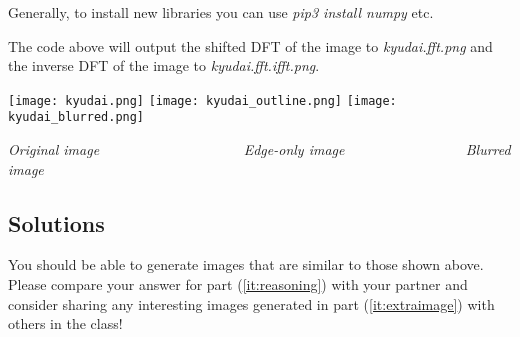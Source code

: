 Generally, to install new libraries you can use \emph{pip3 install numpy} etc.

The code above will output the shifted DFT of the image to \emph{kyudai.fft.png} and the inverse DFT of the image to \emph{kyudai.fft.ifft.png}.

\texttt{[image: kyudai.png]}
\texttt{[image: kyudai\_outline.png]}
\texttt{[image: kyudai\_blurred.png]}

\emph{Original image} ~ ~ ~ ~ ~ ~ ~ ~ ~ ~ ~ ~
\emph{Edge-only image} ~ ~ ~ ~ ~ ~ ~ ~ ~ ~
\emph{Blurred image}

\subsection*{Solutions}
You should be able to generate images that are similar to those shown above. Please compare your answer for part (\ref{it:reasoning}) with your partner and consider sharing any interesting images generated in part (\ref{it:extraimage}) with others in the class!

